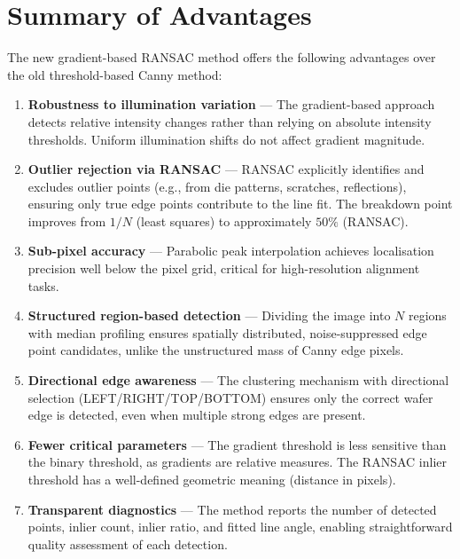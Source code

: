 \documentclass[12pt, a4paper]{article}
\begin{document}
\section{Summary of Advantages}

The new gradient-based RANSAC method offers the following advantages over the old threshold-based Canny method:

\begin{enumerate}
    \item \textbf{Robustness to illumination variation} — The gradient-based approach detects relative intensity changes rather than relying on absolute intensity thresholds. Uniform illumination shifts do not affect gradient magnitude.

    \item \textbf{Outlier rejection via RANSAC} — RANSAC explicitly identifies and excludes outlier points (e.g., from die patterns, scratches, reflections), ensuring only true edge points contribute to the line fit. The breakdown point improves from $1/N$ (least squares) to approximately $50\%$ (RANSAC).

    \item \textbf{Sub-pixel accuracy} — Parabolic peak interpolation achieves localisation precision well below the pixel grid, critical for high-resolution alignment tasks.

    \item \textbf{Structured region-based detection} — Dividing the image into $N$ regions with median profiling ensures spatially distributed, noise-suppressed edge point candidates, unlike the unstructured mass of Canny edge pixels.

    \item \textbf{Directional edge awareness} — The clustering mechanism with directional selection (LEFT/RIGHT/TOP/BOTTOM) ensures only the correct wafer edge is detected, even when multiple strong edges are present.

    \item \textbf{Fewer critical parameters} — The gradient threshold is less sensitive than the binary threshold, as gradients are relative measures. The RANSAC inlier threshold has a well-defined geometric meaning (distance in pixels).

    \item \textbf{Transparent diagnostics} — The method reports the number of detected points, inlier count, inlier ratio, and fitted line angle, enabling straightforward quality assessment of each detection.
\end{enumerate}
\end{document}
